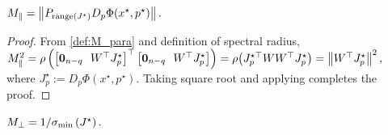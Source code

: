 \documentclass[letterpaper, 10 pt, conference]{ieeeconf}
\begin{document}
\vspace{3mm}

\begin{lemma}\label{lem:M_para}
    \(M_{\parallel} = \left\lVert{P_{\operatorname{range}(J^{\star})} D_{p}\Phi(x^{\star},p^{\star})}\right\rVert.\)
\end{lemma}

\begin{proof}
    From \eqref{def:M_para} and definition of spectral radius,
    \(
    M_{\parallel}^2 = \\ \rho\left(
    \begin{bmatrix} \mathbf{0}_{n-q} \!&\! W^{\top} J_{p}^{\star} \end{bmatrix}^{\top}
    \begin{bmatrix} \mathbf{0}_{n-q} \!&\! W^{\top} J_{p}^{\star} \end{bmatrix}
    \right) = \rho\bigl(J_{p}^{\star\top} W W^{\top} J_{p}^{\star}\bigr) \\
    = \left\lVert{W^{\top} J_{p}^{\star}}\right\rVert^2,
    \) where \(J_{p}^{\star}:=D_{p}\Phi(x^{\star},p^{\star})\).
    Taking square root and applying  completes the proof.
\end{proof}

\vspace{4mm}

\begin{lemma}\label{lem:M_perp}
    \(M_{\perp} = 1/\sigma_{\min}\left(J^{\star}\right).\)
\end{lemma}
\end{document}
